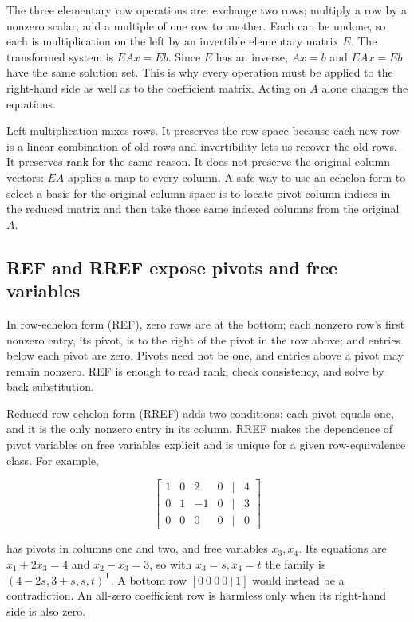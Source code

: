 The three elementary row operations are: exchange two rows; multiply a row by a nonzero scalar; add a multiple of one row to another. Each can be undone, so each is multiplication on the left by an invertible elementary matrix \(E\). The transformed system is \(EAx=Eb\). Since \(E\) has an inverse, \(Ax=b\) and \(EAx=Eb\) have the same solution set. This is why every operation must be applied to the right-hand side as well as to the coefficient matrix. Acting on \(A\) alone changes the equations.

Left multiplication mixes rows. It preserves the row space because each new row is a linear combination of old rows and invertibility lets us recover the old rows. It preserves rank for the same reason. It does not preserve the original column vectors: \(EA\) applies a map to every column. A safe way to use an echelon form to select a basis for the original column space is to locate pivot-column indices in the reduced matrix and then take those same indexed columns from the original \(A\).

\subsection{REF and RREF expose pivots and free variables}\label{ref-and-rref-expose-pivots-and-free-variables}

In row-echelon form (REF), zero rows are at the bottom; each nonzero row's first nonzero entry, its pivot, is to the right of the pivot in the row above; and entries below each pivot are zero. Pivots need not be one, and entries above a pivot may remain nonzero. REF is enough to read rank, check consistency, and solve by back substitution.

Reduced row-echelon form (RREF) adds two conditions: each pivot equals one, and it is the only nonzero entry in its column. RREF makes the dependence of pivot variables on free variables explicit and is unique for a given row-equivalence class. For example,

\[
\begin{bmatrix}1&0&2&0&|&4\\0&1&-1&0&|&3\\0&0&0&0&|&0\end{bmatrix}
\]

has pivots in columns one and two, and free variables \(x_3,x_4\). Its equations are \(x_1+2x_3=4\) and \(x_2-x_3=3\), so with \(x_3=s,x_4=t\) the family is \((4-2s,3+s,s,t)^\mathsf T\). A bottom row \([0\ 0\ 0\ 0\ |\ 1]\) would instead be a contradiction. An all-zero coefficient row is harmless only when its right-hand side is also zero.

